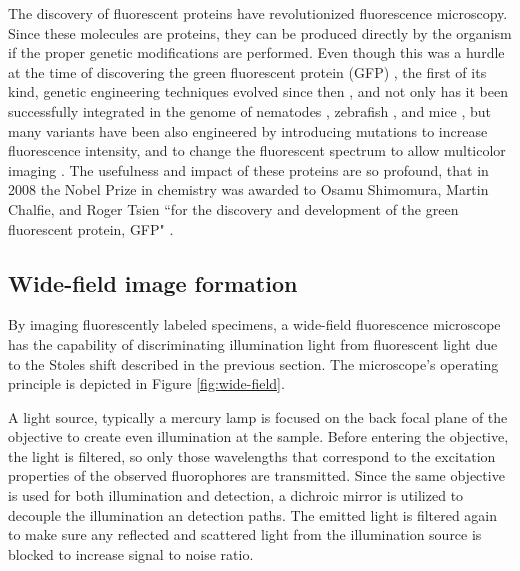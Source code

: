    The discovery of fluorescent proteins have revolutionized fluorescence microscopy. Since these molecules are proteins, they can be produced directly by the organism if the proper genetic modifications are performed. Even though this was a hurdle at the time of discovering the green fluorescent protein (GFP) \cite{shimomura_extraction_1962}, the first of its kind, genetic engineering techniques evolved since then \cite{prasher_primary_1992}, and not only has it been successfully integrated in the genome of nematodes \cite{chalfie_green_1994}, zebrafish \cite{amsterdam_aequorea_1995}, and mice \cite{okabe_green_1997}, but many variants have been also engineered by introducing mutations to increase fluorescence intensity, and to change the fluorescent spectrum to allow multicolor imaging \cite{heim_wavelength_1994,heim_engineering_1996,cormack_facs-optimized_1996,okabe_green_1997}. The usefulness and impact of these proteins are so profound, that in 2008 the Nobel Prize in chemistry was awarded to Osamu Shimomura, Martin Chalfie, and Roger Tsien ``for the discovery and development of the green fluorescent protein, GFP" \cite{service_three_2008}.
    




  \subsection{Wide-field image formation}
    By imaging fluorescently labeled specimens, a wide-field fluorescence microscope has the capability of discriminating illumination light from fluorescent light due to the Stoles shift described in the previous section. The microscope's operating principle is depicted in Figure \ref{fig:wide-field}.

    A light source, typically a mercury lamp is focused on the back focal plane of the objective to create even illumination at the sample. Before entering the objective, the light is filtered, so only those wavelengths that correspond to the excitation properties of the observed fluorophores are transmitted. Since the same objective is used for both illumination and detection, a dichroic mirror is utilized to decouple the illumination an detection paths. The emitted light is filtered again to make sure any reflected and scattered light from the illumination source is blocked to increase signal to noise ratio.

